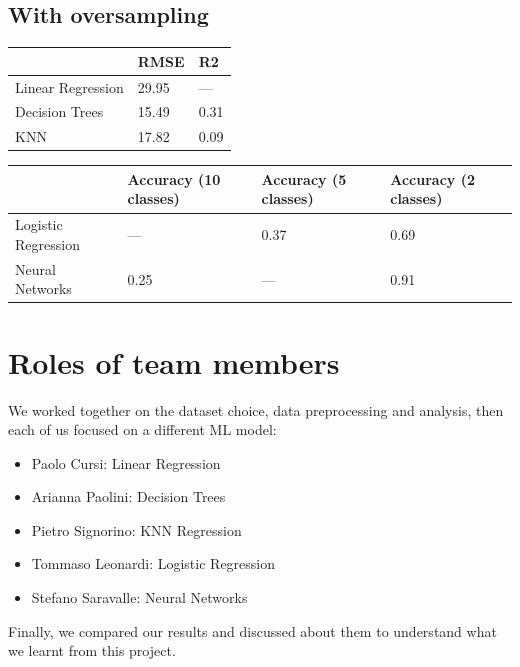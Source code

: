 \documentclass{article}
\begin{document}
\subsection{With oversampling}

\begin{table}[h!]
    \centering
    \begin{tabular}{l|l|l|}
    \cline{2-3}
                                            & RMSE  & R2   \\ \hline
    \multicolumn{1}{|l|}{Linear Regression} & 29.95 & ---  \\ \hline
    \multicolumn{1}{|l|}{Decision Trees}    & 15.49 & 0.31 \\ \hline
    \multicolumn{1}{|l|}{KNN}               & 17.82 & 0.09 \\ \hline
\end{tabular}
\end{table}

\begin{table}[h!]
    \centering
    \begin{tabular}{l|l|l|l|}
    \cline{2-4}
                                              & Accuracy (10 classes) & Accuracy (5 classes)  & Accuracy (2 classes) \\ \hline
    \multicolumn{1}{|l|}{Logistic Regression} & ---                   & 0.37                  & 0.69                \\ \hline
    \multicolumn{1}{|l|}{Neural Networks}     & 0.25                  & ---                   & 0.91                \\ \hline
\end{tabular}
\end{table}



\section{Roles of team members}
We worked together on the dataset choice, data preprocessing and analysis, then each of us focused on a different ML model: 
\begin{itemize}
    \item Paolo Cursi: Linear Regression
    \item Arianna Paolini: Decision Trees
    \item Pietro Signorino: KNN Regression
    \item Tommaso Leonardi: Logistic Regression
    \item Stefano Saravalle: Neural Networks
\end{itemize}
Finally, we compared our results and discussed about them to understand what we learnt from this project.



\end{document}
